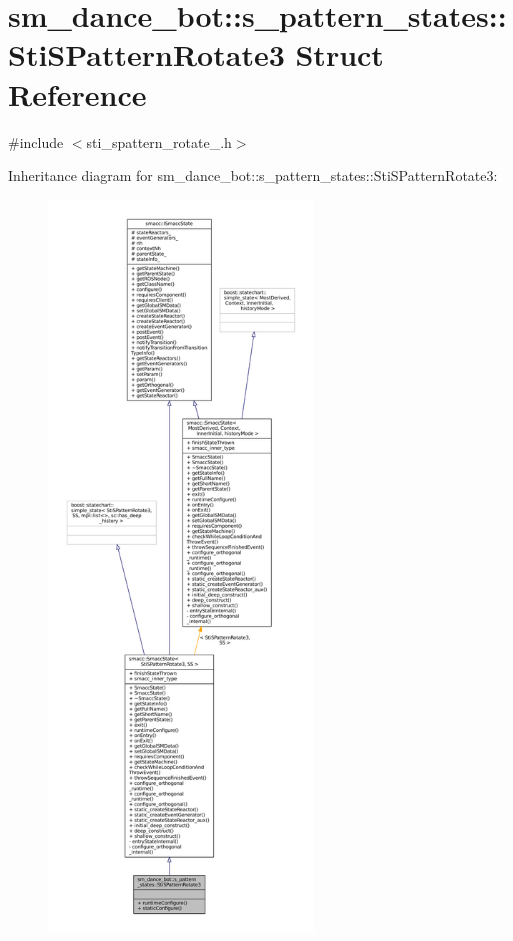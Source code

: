 \hypertarget{structsm__dance__bot_1_1s__pattern__states_1_1StiSPatternRotate3}{}\section{sm\+\_\+dance\+\_\+bot\+:\+:s\+\_\+pattern\+\_\+states\+:\+:Sti\+S\+Pattern\+Rotate3 Struct Reference}
\label{structsm__dance__bot_1_1s__pattern__states_1_1StiSPatternRotate3}


{\ttfamily \#include $<$sti\+\_\+spattern\+\_\+rotate\+\_.\+h$>$}



Inheritance diagram for sm\+\_\+dance\+\_\+bot\+:\+:s\+\_\+pattern\+\_\+states\+:\+:Sti\+S\+Pattern\+Rotate3\+:
\nopagebreak
\begin{figure}[H]
\begin{center}
\leavevmode
\includegraphics[height=550pt]{structsm__dance__bot_1_1s__pattern__states_1_1StiSPatternRotate3__inherit__graph}
\end{center}
\end{figure}


